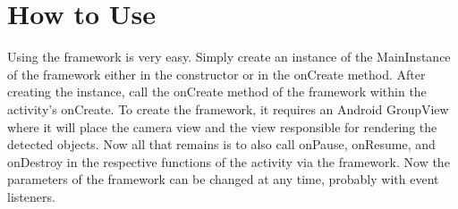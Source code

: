 \section{How to Use}

Using the framework is very easy.
Simply create an instance of the MainInstance of the framework either in the constructor or in the onCreate method.
After creating the instance, call the onCreate method of the framework within the activity's onCreate.
To create the framework, it requires an Android GroupView where it will place the camera view and the view responsible for rendering the detected objects.
Now all that remains is to also call onPause, onResume, and onDestroy in the respective functions of the activity via the framework.
Now the parameters of the framework can be changed at any time, probably with event listeners.
